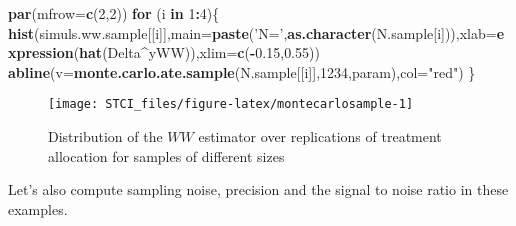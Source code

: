 \documentclass[]{book}
\newenvironment{Shaded}{\begin{snugshade}}{\end{snugshade}}
\newcommand{\KeywordTok}[1]{\textcolor[rgb]{0.13,0.29,0.53}{\textbf{#1}}}
\newcommand{\DataTypeTok}[1]{\textcolor[rgb]{0.13,0.29,0.53}{#1}}
\newcommand{\DecValTok}[1]{\textcolor[rgb]{0.00,0.00,0.81}{#1}}
\newcommand{\FloatTok}[1]{\textcolor[rgb]{0.00,0.00,0.81}{#1}}
\newcommand{\StringTok}[1]{\textcolor[rgb]{0.31,0.60,0.02}{#1}}
\newcommand{\ControlFlowTok}[1]{\textcolor[rgb]{0.13,0.29,0.53}{\textbf{#1}}}
\newcommand{\OperatorTok}[1]{\textcolor[rgb]{0.81,0.36,0.00}{\textbf{#1}}}
\newcommand{\NormalTok}[1]{#1}
\theoremstyle{definition}
\theoremstyle{definition}
\theoremstyle{definition}
\theoremstyle{remark}
\begin{document}
\begin{Shaded}
\begin{Highlighting}[]
\KeywordTok{par}\NormalTok{(}\DataTypeTok{mfrow=}\KeywordTok{c}\NormalTok{(}\DecValTok{2}\NormalTok{,}\DecValTok{2}\NormalTok{))}
\ControlFlowTok{for}\NormalTok{ (i }\ControlFlowTok{in} \DecValTok{1}\OperatorTok{:}\DecValTok{4}\NormalTok{)\{}
  \KeywordTok{hist}\NormalTok{(simuls.ww.sample[[i]],}\DataTypeTok{main=}\KeywordTok{paste}\NormalTok{(}\StringTok{'N='}\NormalTok{,}\KeywordTok{as.character}\NormalTok{(N.sample[i])),}\DataTypeTok{xlab=}\KeywordTok{expression}\NormalTok{(}\KeywordTok{hat}\NormalTok{(Delta}\OperatorTok{^}\NormalTok{yWW)),}\DataTypeTok{xlim=}\KeywordTok{c}\NormalTok{(}\OperatorTok{-}\FloatTok{0.15}\NormalTok{,}\FloatTok{0.55}\NormalTok{))}
  \KeywordTok{abline}\NormalTok{(}\DataTypeTok{v=}\KeywordTok{monte.carlo.ate.sample}\NormalTok{(N.sample[[i]],}\DecValTok{1234}\NormalTok{,param),}\DataTypeTok{col=}\StringTok{"red"}\NormalTok{)}
\NormalTok{\}}
\end{Highlighting}
\end{Shaded}

\begin{figure}[htbp]

{\centering \texttt{[image: STCI\_files/figure-latex/montecarlosample-1]} 

}

\caption{Distribution of the $WW$ estimator over replications of treatment allocation for samples of different sizes}\label{fig:montecarlosample}
\end{figure}

Let's also compute sampling noise, precision and the signal to noise
ratio in these examples.
\end{document}
